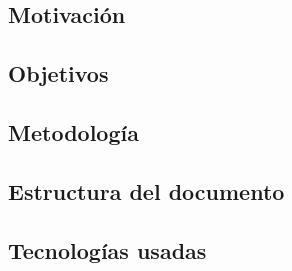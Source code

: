 \documentclass[../../main.tex]{subfiles}
\begin{document}
\subsection{Motivación}

\subsection{Objetivos}

\subsection{Metodología}



\subsection{Estructura del documento}


\subsection{Tecnologías usadas}
\end{document}

